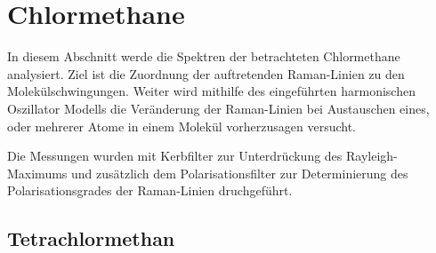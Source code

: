 \documentclass[../bericht.tex]{subfiles}
\begin{document}
    \section{Chlormethane}

      In diesem Abschnitt werde die Spektren der betrachteten Chlormethane analysiert. Ziel ist die Zuordnung der auftretenden Raman-Linien zu den  Molekülschwingungen. Weiter wird mithilfe des eingeführten harmonischen Oszillator Modells die Veränderung der Raman-Linien bei Austauschen eines, oder mehrerer Atome in einem Molekül vorherzusagen versucht.

      Die Messungen wurden mit Kerbfilter zur Unterdrückung des Rayleigh-Maximums und zusätzlich dem Polarisationsfilter zur Determinierung des Polarisationsgrades der Raman-Linien druchgeführt.


      \subsection{Tetrachlormethan}
      \label{subsec:tetrachlor}
\end{document}
